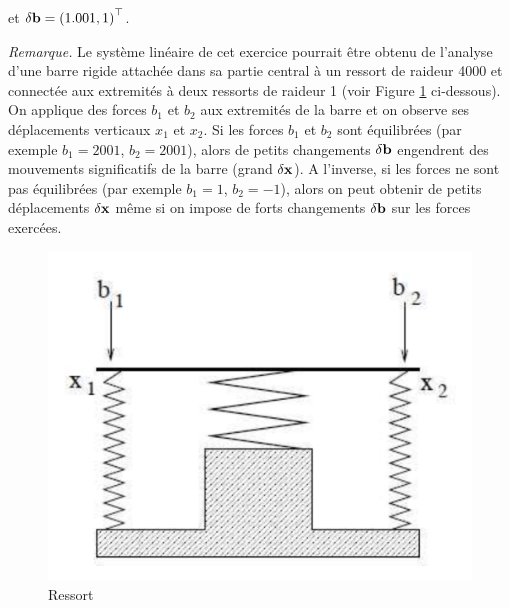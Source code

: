 \begin{enumerate}[label=\alph*)]
  et $\delta \mathbf{b} = \left(1.001, 1\right)^{\top}$.
  
  \textit{Remarque.}
  Le système linéaire de cet exercice pourrait être obtenu de l'analyse d'une barre rigide attachée dans sa partie central à un ressort de raideur 4000 et connectée aux extremités à deux ressorts de raideur 1 (voir Figure \ref{fig:ressort} ci-dessous).
  On applique des forces $b_{1}$ et $b_{2}$ aux extremités de la barre et on observe ses déplacements verticaux $x_{1}$ et $x_{2}$.
  Si les forces $b_{1}$ et $b_{2}$ sont équilibrées (par exemple $b_{1} = 2001$, $b_{2} = 2001$), alors de petits changements $\delta \mathbf{b}$ engendrent des mouvements significatifs de la barre (grand $\delta \mathbf{x}$).
  A l'inverse, si les forces ne sont pas équilibrées (par exemple $b_{1} = 1$, $b_{2} = -1$), alors on peut obtenir de petits déplacements $\delta \mathbf{x}$ même si on impose de forts changements $\delta \mathbf{b}$ sur les forces exercées.
  
  \begin{figure}[h!]
  \centering
  \includegraphics[scale = 0.2]{s2/images/ressort.png}
  \caption{Ressort}
  \label{fig:ressort}
\end{figure}


\end{enumerate}





